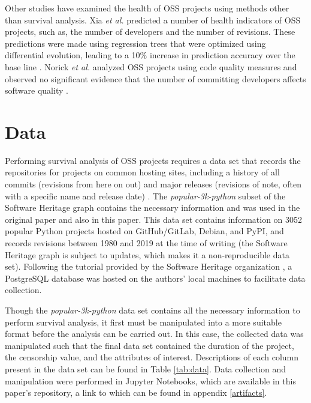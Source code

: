 \documentclass[acmconf]{acmart}
\begin{document}
Other studies have examined the health of OSS projects using methods other than survival analysis. 
Xia \emph{et al.} predicted a number of health indicators of OSS projects, such as, the number of developers and the number of revisions.
These predictions were made using regression trees that were optimized using differential evolution, leading to a 10\% increase in prediction accuracy over the base line \cite{xia2020predicting}. 
Norick \emph{et al.} analyzed OSS projects using code quality measures and observed no significant evidence that the number of committing developers affects software quality \cite{norick2010effects}. 

\section{Data} \label{data}

Performing survival analysis of OSS projects requires a data set that records the repositories for projects on common hosting sites, including a history of all commits (revisions from here on out) and major releases (revisions of note, often with a specific name and release date) \cite{ali2020cheating}. 
The \emph{popular-3k-python} subset of the Software Heritage graph \cite{pietri2019software} contains the necessary information and was used in the original paper and also in this paper.
This data set contains information on 3052 popular Python projects hosted on GitHub/GitLab, Debian, and PyPI, and records revisions between 1980 and 2019 at the time of writing (the Software Heritage graph is subject to updates, which makes it a non-reproducible data set).
Following the tutorial provided by the Software Heritage organization \cite{SQLdataset}, a PostgreSQL database was hosted on the authors' local machines to facilitate data collection.

Though the \emph{popular-3k-python} data set contains all the necessary information to perform survival analysis, it first must be manipulated into a more suitable format before the analysis can be carried out. 
In this case, the collected data was manipulated such that the final data set contained the duration of the project, the censorship value, and the attributes of interest. 
Descriptions of each column present in the data set can be found in Table \ref{tab:data}. 
Data collection and manipulation were performed in Jupyter Notebooks, which are available in this paper's repository, a link to which can be found in appendix \ref{artifacts}. 
\end{document}
